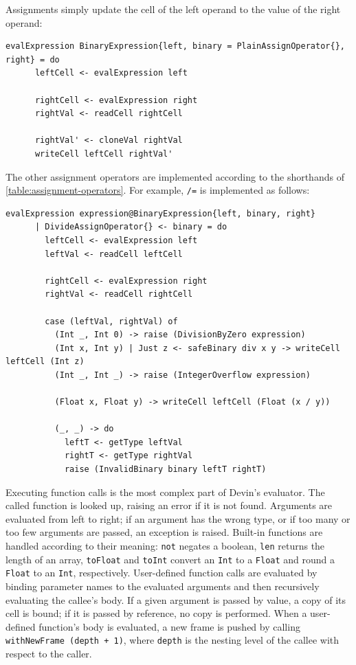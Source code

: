 \documentclass[UdineBachThesis,american,11pt]{PhdThesis}
\begin{document}
  Assignments simply update the cell of the left operand to the value of the
  right operand:

  \begin{Verbatim}[gobble=4,fontsize=\small]
    evalExpression BinaryExpression{left, binary = PlainAssignOperator{}, right} = do
      leftCell <- evalExpression left

      rightCell <- evalExpression right
      rightVal <- readCell rightCell

      rightVal' <- cloneVal rightVal
      writeCell leftCell rightVal'
  \end{Verbatim}

  The other assignment operators are implemented according to the shorthands of
  \autoref{table:assignment-operators}. For example, \mbox{\texttt{/=}} is
  implemented as follows:

  \begin{Verbatim}[gobble=4,fontsize=\small]
    evalExpression expression@BinaryExpression{left, binary, right}
      | DivideAssignOperator{} <- binary = do
        leftCell <- evalExpression left
        leftVal <- readCell leftCell

        rightCell <- evalExpression right
        rightVal <- readCell rightCell

        case (leftVal, rightVal) of
          (Int _, Int 0) -> raise (DivisionByZero expression)
          (Int x, Int y) | Just z <- safeBinary div x y -> writeCell leftCell (Int z)
          (Int _, Int _) -> raise (IntegerOverflow expression)

          (Float x, Float y) -> writeCell leftCell (Float (x / y))

          (_, _) -> do
            leftT <- getType leftVal
            rightT <- getType rightVal
            raise (InvalidBinary binary leftT rightT)
  \end{Verbatim}

  Executing function calls is the most complex part of Devin's evaluator. The
  called function is looked up, raising an error if it is not found. Arguments
  are evaluated from left to right; if an argument has the wrong type, or if too
  many or too few arguments are passed, an exception is raised. Built-in
  functions are handled according to their meaning: \mbox{\texttt{not}} negates
  a boolean, \mbox{\texttt{len}} returns the length of an array,
  \mbox{\texttt{toFloat}} and \mbox{\texttt{toInt}} convert an
  \mbox{\texttt{Int}} to a \mbox{\texttt{Float}} and round a
  \mbox{\texttt{Float}} to an \mbox{\texttt{Int}}, respectively. User-defined
  function calls are evaluated by binding parameter names to the evaluated
  arguments and then recursively evaluating the callee's body. If a given
  argument is passed by value, a copy of its cell is bound; if it is passed by
  reference, no copy is performed. When a user-defined function's body is
  evaluated, a new frame is pushed by calling
  \mbox{\texttt{withNewFrame (depth + 1)}}, where \mbox{\texttt{depth}} is the
  nesting level of the callee with respect to the caller.
\end{document}

